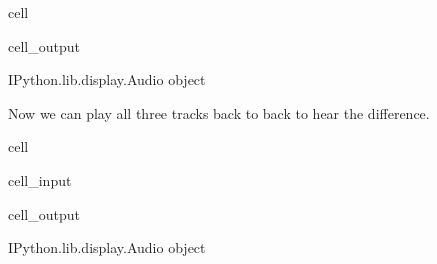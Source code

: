 \documentclass[letterpaper,10pt,english]{jupyterBook}
\begin{document}
\begin{sphinxuseclass}{cell}
\begin{sphinxVerbatimOutput}
\begin{sphinxuseclass}{cell_output}
\noindent{}

\begin{sphinxVerbatim}[commandchars=\\\{\}]
\PYGZlt{}IPython.lib.display.Audio object\PYGZgt{}
\end{sphinxVerbatim}

\end{sphinxuseclass}\end{sphinxVerbatimOutput}

\end{sphinxuseclass}
\sphinxAtStartPar
Now we can play all three tracks back to back to hear the difference.

\begin{sphinxuseclass}{cell}\begin{sphinxVerbatimInput}

\begin{sphinxuseclass}{cell_input}
\begin{sphinxVerbatim}[commandchars=\\\{\}]
 
\end{sphinxVerbatim}

\end{sphinxuseclass}\end{sphinxVerbatimInput}
\begin{sphinxVerbatimOutput}

\begin{sphinxuseclass}{cell_output}
\begin{sphinxVerbatim}[commandchars=\\\{\}]
\PYGZlt{}IPython.lib.display.Audio object\PYGZgt{}
\end{sphinxVerbatim}

\end{sphinxuseclass}\end{sphinxVerbatimOutput}

\end{sphinxuseclass}
\end{document}
